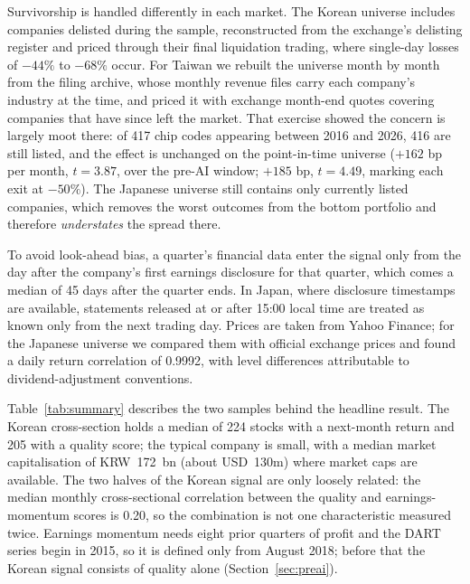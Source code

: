 \documentclass[12pt,a4paper]{article}
\begin{document}
Survivorship is handled differently in each market. The Korean universe includes companies delisted during the sample, reconstructed from the
exchange's delisting register and priced through their final liquidation trading, where single-day losses of $-44\%$ to
$-68\%$ occur. For Taiwan we rebuilt the universe month by month from the filing archive, whose monthly revenue files
carry each company's industry at the time, and priced it with exchange month-end quotes covering companies that have
since left the market. That exercise showed the concern is largely moot there: of 417 chip codes appearing between 2016
and 2026, 416 are still listed, and the effect is unchanged on the point-in-time universe ($+162$ bp per month,
$t=3.87$, over the pre-AI window; $+185$ bp, $t=4.49$, marking each exit at $-50\%$). The Japanese universe still
contains only currently listed companies, which removes the worst outcomes from the bottom portfolio and therefore
\emph{understates} the spread there.

To avoid look-ahead bias, a quarter's financial data enter the signal only from the day after the company's first
earnings disclosure for that quarter, which comes a median of 45 days after the quarter ends. In Japan, where
disclosure timestamps are available, statements released at or after 15:00 local time are treated as known only from
the next trading day. Prices are taken from Yahoo Finance; for the Japanese universe we compared them with official
exchange prices and found a daily return correlation of 0.9992, with level differences attributable to
dividend-adjustment conventions.

Table~\ref{tab:summary} describes the two samples behind the headline result. The
Korean cross-section holds a median of 224 stocks with a next-month return and 205 with a quality score; the typical
company is small, with a median market capitalisation of KRW~172~bn (about USD~130m) where market caps are available.
The two halves of the Korean signal are only loosely related: the median monthly cross-sectional correlation between
the quality and earnings-momentum scores is 0.20, so the combination is not one characteristic measured twice.
Earnings momentum needs eight prior quarters of profit and the DART series begin in 2015, so it is defined only from
August 2018; before that the Korean signal consists of quality alone (Section~\ref{sec:preai}).
\end{document}
